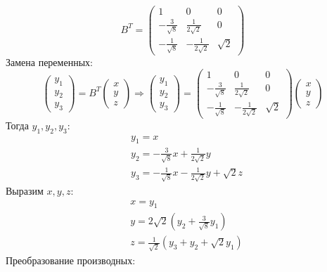 \documentclass[a4paper,12pt]{article}
\begin{document}
\[
B^{T} =
\begin{pmatrix}
1 & 0 & 0 \\
-\frac{3}{\sqrt{8}} & \frac{1}{2\sqrt{2}} & 0 \\
-\frac{1}{\sqrt{8}} & -\frac{1}{2\sqrt{2}} & \sqrt{2}
\end{pmatrix}
\]
Замена переменных:
\[
\begin{pmatrix}
y_1 \\
y_2 \\
y_3
\end{pmatrix}
=
B^{T}
\begin{pmatrix}
x \\
y \\
z
\end{pmatrix}
\Rightarrow
\begin{pmatrix}
y_1 \\
y_2 \\
y_3
\end{pmatrix}
=
\begin{pmatrix}
1 & 0 & 0 \\
-\frac{3}{\sqrt{8}} & \frac{1}{2\sqrt{2}} & 0 \\
-\frac{1}{\sqrt{8}} & -\frac{1}{2\sqrt{2}} & \sqrt{2}
\end{pmatrix}
\begin{pmatrix}
x \\
y \\
z
\end{pmatrix}
\]
Тогда $y_1, y_2, y_3$:
\begin{align*}
   &y_1 = x\\
   &y_2 = -\frac{3}{\sqrt{8}}x + \frac{1}{2\sqrt{2}}y\\
   &y_3 =-\frac{1}{\sqrt{8}}x-\frac{1}{2\sqrt{2}}y+ \sqrt{2}z
\end{align*}
Выразим $x, y, z$:
\begin{align*}
   &x = y_1\\
   &y = 2\sqrt{2}(y_2 +\frac{3}{\sqrt{8}}y_1)\\
   &z =\frac{1}{\sqrt{2}}(y_3+y_2+\sqrt{2}y_1)
\end{align*}
Преобразование производных:
\end{document}
